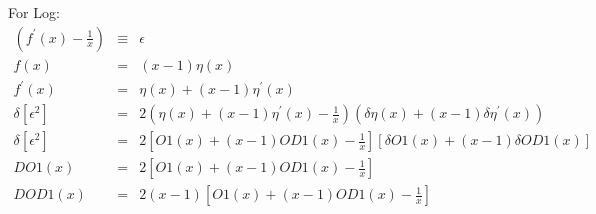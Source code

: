 \documentclass[12pt,a4paper]{article}
\begin{document}
		For Log:		
		\begin{eqnarray*}
			\left(f^{\prime}\left(x\right)-\frac{1}{x}\right) & \equiv & \epsilon\\
			f\left(x\right) & = & \left(x-1\right)\eta\left(x\right)\\
			f^{\prime}\left(x\right) & = & \eta\left(x\right)+\left(x-1\right)\eta^{\prime}\left(x\right)\\
			\delta\left[\epsilon^{2}\right] & = & 2\left(\eta\left(x\right)+\left(x-1\right)\eta^{\prime}\left(x\right)-\frac{1}{x}\right)\left(\delta\eta\left(x\right)+\left(x-1\right)\delta\eta^{\prime}\left(x\right)\right)\\
			\delta\left[\epsilon^{2}\right] & = & 2\left[O1\left(x\right)+\left(x-1\right)OD1\left(x\right)-\frac{1}{x}\right]\left[\delta O1\left(x\right)+\left(x-1\right)\delta OD1\left(x\right)\right]\\
			DO1\left(x\right) & = & 2\left[O1\left(x\right)+\left(x-1\right)OD1\left(x\right)-\frac{1}{x}\right]\\
			DOD1\left(x\right) & = & 2\left(x-1\right)\left[O1\left(x\right)+\left(x-1\right)OD1\left(x\right)-\frac{1}{x}\right]
		\end{eqnarray*}
		
\end{document}
